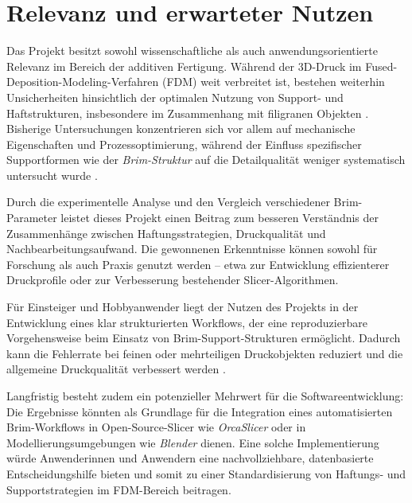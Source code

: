 \chapter{Relevanz und erwarteter Nutzen}
\label{cha:Relevanz und erwarteter Nutzen}

Das Projekt besitzt sowohl wissenschaftliche als auch anwendungsorientierte Relevanz im Bereich der additiven Fertigung.  
Während der 3D-Druck im Fused-Deposition-Modeling-Verfahren (FDM) weit verbreitet ist, bestehen weiterhin Unsicherheiten hinsichtlich der optimalen Nutzung von Support- und Haftstrukturen, insbesondere im Zusammenhang mit filigranen Objekten \cite{Kristiawan2021, FDMReview2021}.  
Bisherige Untersuchungen konzentrieren sich vor allem auf mechanische Eigenschaften und Prozessoptimierung, während der Einfluss spezifischer Supportformen wie der \textit{Brim-Struktur} auf die Detailqualität weniger systematisch untersucht wurde \cite{FFFPolymerReview}.  

Durch die experimentelle Analyse und den Vergleich verschiedener Brim-Parameter leistet dieses Projekt einen Beitrag zum besseren Verständnis der Zusammenhänge zwischen Haftungsstrategien, Druckqualität und Nachbearbeitungsaufwand.  
Die gewonnenen Erkenntnisse können sowohl für Forschung als auch Praxis genutzt werden – etwa zur Entwicklung effizienterer Druckprofile oder zur Verbesserung bestehender Slicer-Algorithmen.  

Für Einsteiger und Hobbyanwender liegt der Nutzen des Projekts in der Entwicklung eines klar strukturierten Workflows, der eine reproduzierbare Vorgehensweise beim Einsatz von Brim-Support-Strukturen ermöglicht.  
Dadurch kann die Fehlerrate bei feinen oder mehrteiligen Druckobjekten reduziert und die allgemeine Druckqualität verbessert werden \cite{Facfox2023, JLC3DP2023}.  

Langfristig besteht zudem ein potenzieller Mehrwert für die Softwareentwicklung:  
Die Ergebnisse könnten als Grundlage für die Integration eines automatisierten Brim-Workflows in Open-Source-Slicer wie \textit{OrcaSlicer} oder in Modellierungsumgebungen wie \textit{Blender} dienen.  
Eine solche Implementierung würde Anwenderinnen und Anwendern eine nachvollziehbare, datenbasierte Entscheidungshilfe bieten und somit zu einer Standardisierung von Haftungs- und Supportstrategien im FDM-Bereich beitragen.
